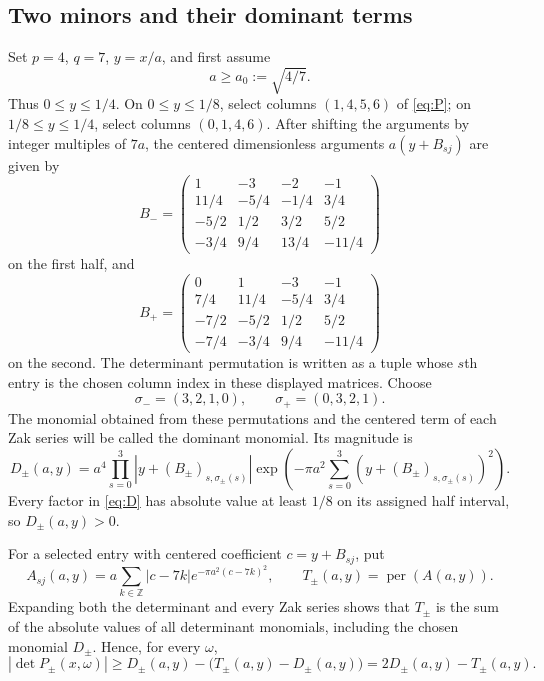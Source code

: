 \documentclass[11pt]{article}
\newcommand{\Z}{\mathbb Z}
\newcommand{\per}{\operatorname{per}}
\begin{document}
\subsection{Two minors and their dominant terms}
Set $p=4$, $q=7$, $y=x/a$, and first assume
\begin{equation}\label{eq:a-large}
 a\ge a_0:=\sqrt{4/7}.
\end{equation}
Thus $0\le y\le1/4$.  On $0\le y\le1/8$, select columns
$(1,4,5,6)$ of \eqref{eq:P}; on $1/8\le y\le1/4$, select columns
$(0,1,4,6)$.  After shifting the arguments by integer multiples of
$7a$, the centered dimensionless arguments $a(y+B_{sj})$ are given by
\begin{equation}\label{eq:Bminus}
B_-=
\begin{pmatrix}
1&-3&-2&-1\\
11/4&-5/4&-1/4&3/4\\
-5/2&1/2&3/2&5/2\\
-3/4&9/4&13/4&-11/4
\end{pmatrix}
\end{equation}
on the first half, and
\begin{equation}\label{eq:Bplus}
B_+=
\begin{pmatrix}
0&1&-3&-1\\
7/4&11/4&-5/4&3/4\\
-7/2&-5/2&1/2&5/2\\
-7/4&-3/4&9/4&-11/4
\end{pmatrix}
\end{equation}
on the second.  The determinant permutation is written as a tuple whose
$s$th entry is the chosen column index in these displayed matrices.  Choose
\[
 \sigma_-=(3,2,1,0),\qquad \sigma_+=(0,3,2,1).
\]
The monomial obtained from these permutations and the centered term of each
Zak series will be called the dominant monomial.  Its magnitude is
\begin{equation}\label{eq:D}
 D_\pm(a,y)=a^4
 \prod_{s=0}^3|y+(B_\pm)_{s,\sigma_\pm(s)}|
 \exp\!\left(-\pi a^2
 \sum_{s=0}^3(y+(B_\pm)_{s,\sigma_\pm(s)})^2\right).
\end{equation}
Every factor in \eqref{eq:D} has absolute value at least $1/8$ on its
assigned half interval, so $D_\pm(a,y)>0$.

For a selected entry with centered coefficient $c=y+B_{sj}$, put
\[
 A_{sj}(a,y)=a\sum_{k\in\Z}|c-7k|e^{-\pi a^2(c-7k)^2},
 \qquad T_\pm(a,y)=\per(A(a,y)).
\]
Expanding both the determinant and every Zak series shows that
$T_\pm$ is the sum of the absolute values of all determinant monomials,
including the chosen monomial $D_\pm$.  Hence, for every $\omega$,
\begin{equation}\label{eq:reverse-triangle}
 |\det P_\pm(x,\omega)|
 \ge D_\pm(a,y)-\bigl(T_\pm(a,y)-D_\pm(a,y)\bigr)
 =2D_\pm(a,y)-T_\pm(a,y).
\end{equation}
\end{document}
